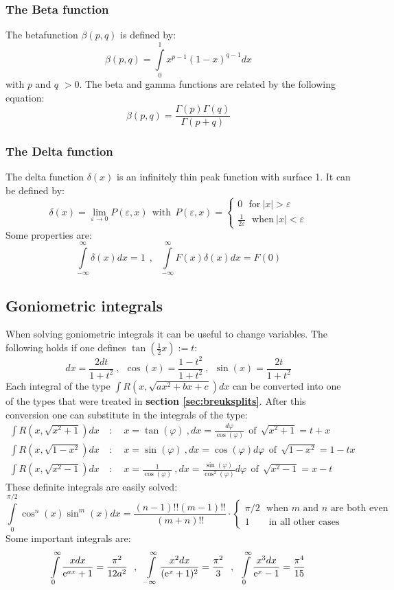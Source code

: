 \subsubsection{The Beta function}
The betafunction $\beta(p,q)$ is defined by:
\[
\beta(p,q)=\int\limits_0^1x^{p-1}(1-x)^{q-1}dx
\]
with $p$ and $q$ $>0$. The beta and gamma functions are related by the
following equation:
\[
\beta(p,q)=\frac{\Gamma(p)\Gamma(q)}{\Gamma(p+q)}
\]

\subsubsection{The Delta function}
The delta function $\delta(x)$ is an infinitely thin peak function with
surface 1. It can be defined by:
\[
\delta(x)=\lim_{\varepsilon\rightarrow0}P(\varepsilon,x)~~\mbox{with}~~
P(\varepsilon,x)=\left\{
\begin{array}{l}
0~~~\mbox{for}~|x|>\varepsilon\\
\displaystyle\frac{1}{2\varepsilon}~~~\mbox{when}~|x|<\varepsilon
\end{array}\right.
\]
Some properties are:
\[
\int\limits_{-\infty}^\infty\delta(x)dx=1~~,~~~
\int\limits_{-\infty}^\infty F(x)\delta(x)dx=F(0)
\]

\subsection{Goniometric integrals}
When solving goniometric integrals it can be useful to change variables. The
following holds if one defines $\tan(\frac{1}{2}x):=t$:
\[
dx=\frac{2dt}{1+t^2}~,~~\cos(x)=\frac{1-t^2}{1+t^2}~,~~\sin(x)=\frac{2t}{1+t^2}
\]
Each integral of the type $\int R(x,\sqrt{ax^2+bx+c})dx$ can be converted into
one of the types that were treated in {\bf section \ref{sec:breuksplits}}.
After this conversion one can substitute in the integrals of the type:
\begin{eqnarray*}
\int R(x,\sqrt{x^2+1})dx&~:~~&x=\tan(\varphi)          ~,dx=\frac{d\varphi}{\cos(\varphi)}               ~~\mbox{of}~~\sqrt{x^2+1}=t+x\\
\int R(x,\sqrt{1-x^2})dx&~:~~&x=\sin(\varphi)          ~,dx=\cos(\varphi)d\varphi                        ~~\mbox{of}~~\sqrt{1-x^2}=1-tx\\
\int R(x,\sqrt{x^2-1})dx&~:~~&x=\frac{1}{\cos(\varphi)}~,dx=\frac{\sin(\varphi)}{\cos^2(\varphi)}d\varphi~~\mbox{of}~~\sqrt{x^2-1}=x-t
\end{eqnarray*}
These definite integrals are easily solved:
\[
\int\limits_0^{\pi/2}\cos^n(x)\sin^m(x)dx=\frac{(n-1)!!(m-1)!!}{(m+n)!!}\cdot
\left\{\begin{array}{l}
\pi/2\mbox{~~when $m$ and $n$ are both even}\\
1\mbox{~~~~~~in all other cases}
\end{array}\right.
\]
Some important integrals are:
\[
\int\limits_0^\infty\frac{xdx}{{\rm e}^{ax}+1}=\frac{\pi^2}{12a^2}~~,~~
\int\limits_{-\infty}^\infty\frac{x^2dx}{({\rm e}^x+1)^2}=\frac{\pi^2}{3}~~,~~
\int\limits_0^\infty\frac{x^3dx}{{\rm e}^x-1}=\frac{\pi^4}{15}
\]

